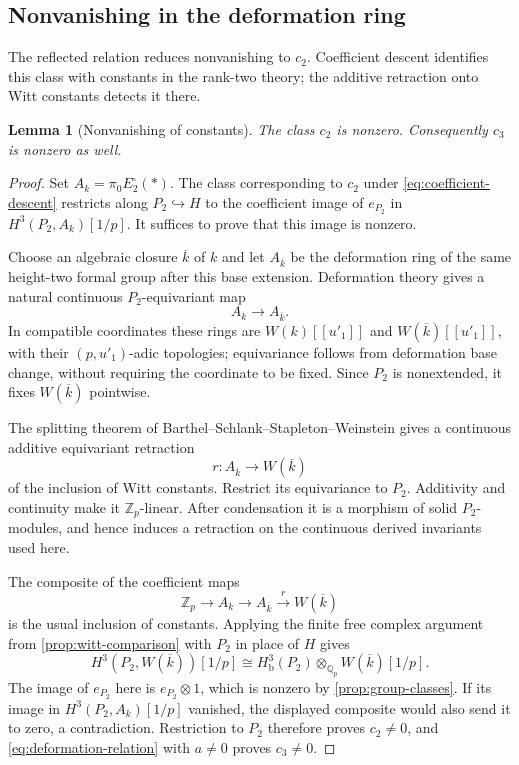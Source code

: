 \documentclass[11pt]{article}
\numberwithin{equation}{section}
\newtheorem{lemma}[theorem]{Lemma}
\theoremstyle{definition}
\theoremstyle{remark}
\begin{document}
\subsection{Nonvanishing in the deformation ring}

The reflected relation reduces nonvanishing to $c_2$. Coefficient
descent identifies this class with constants in the rank-two theory;
the additive retraction onto Witt constants detects it there.

\begin{lemma}[Nonvanishing of constants]\label{lem:constant-nonvanishing}
The class $c_2$ is nonzero.  Consequently $c_3$ is nonzero as well.
\end{lemma}

\begin{proof}
Set $A_k=\pi_0E_2^{\square}(*)$.  The class corresponding to $c_2$
under \eqref{eq:coefficient-descent} restricts along $P_2\hookrightarrow H$
to the coefficient image of $e_{P_2}$ in $H^3(P_2,A_k)[1/p]$.
It suffices to prove that this image is nonzero.

Choose an algebraic closure $\overline k$ of $k$ and let
$A_{\overline k}$ be the deformation ring of the same height-two
formal group after this base extension.  Deformation theory gives
a natural continuous $P_2$-equivariant map
\[
 A_k\longrightarrow A_{\overline k}.
\]
In compatible coordinates these rings are $W(k)[[u'_1]]$ and
$W(\overline k)[[u'_1]]$, with their $(p,u'_1)$-adic topologies;
equivariance follows from deformation base change, without requiring
the coordinate to be fixed.  Since $P_2$ is nonextended, it fixes
$W(\overline k)$ pointwise.

The splitting theorem of Barthel--Schlank--Stapleton--Weinstein
\cite[Proposition~2.5.1 and Corollary~2.5.9]{BSSW2025} gives a
continuous additive equivariant retraction
\[
 r:A_{\overline k}\longrightarrow W(\overline k)
\]
of the inclusion of Witt constants. Restrict its equivariance to $P_2$.
Additivity and continuity make it $\mathbb Z_p$-linear. After condensation
it is a morphism of solid $P_2$-modules, and hence
induces a retraction on the continuous derived invariants used here.

The composite of the coefficient maps
\[
 \mathbb Z_p\longrightarrow A_k\longrightarrow A_{\overline k}
       \xrightarrow{r}W(\overline k)
\]
is the usual inclusion of constants.  Applying the finite free
complex argument from \cref{prop:witt-comparison} with $P_2$ in
place of $H$ gives
\[
 H^3(P_2,W(\overline k))[1/p]
   \cong H^3_{\mathrm b}(P_2)
          \otimes_{\mathbb Q_p}W(\overline k)[1/p].
\]
The image of $e_{P_2}$ here is $e_{P_2}\otimes1$, which is nonzero
by \cref{prop:group-classes}.  If its image in
$H^3(P_2,A_k)[1/p]$ vanished, the displayed composite would also
send it to zero, a contradiction.  Restriction to $P_2$ therefore
proves $c_2\ne0$, and \eqref{eq:deformation-relation} with $a\ne0$
proves $c_3\ne0$.
\end{proof}
\end{document}
